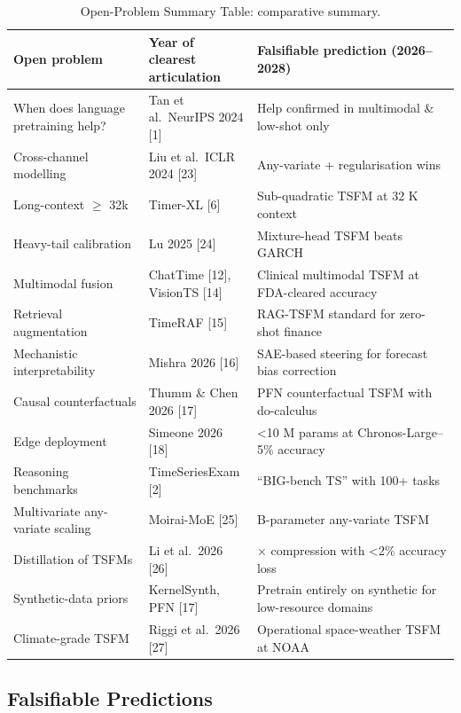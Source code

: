 \documentclass{article}
\begin{document}
\begin{table}[t]
\centering
\caption{Open-Problem Summary Table: comparative summary.}
\label{tab:open-problem-summary-table}
\begin{tabular}{>{\raggedright\arraybackslash}p{0.3000\linewidth}
  >{\raggedright\arraybackslash}p{0.2417\linewidth}
  >{\raggedright\arraybackslash}p{0.4583\linewidth}}
\toprule
Open problem & Year of clearest articulation & Falsifiable prediction (2026--2028) \\
\midrule
When does language pretraining help? & Tan et al.~NeurIPS 2024 {[}1{]} & Help confirmed in multimodal \& low-shot only \\
Cross-channel modelling & Liu et al.~ICLR 2024 {[}23{]} & Any-variate + regularisation wins \\
Long-context \(\geq\) 32k & Timer-XL {[}6{]} & Sub-quadratic TSFM at 32 K context \\
Heavy-tail calibration & Lu 2025 {[}24{]} & Mixture-head TSFM beats GARCH \\
Multimodal fusion & ChatTime {[}12{]}, VisionTS {[}14{]} & Clinical multimodal TSFM at FDA-cleared accuracy \\
Retrieval augmentation & TimeRAF {[}15{]} & RAG-TSFM standard for zero-shot finance \\
Mechanistic interpretability & Mishra 2026 {[}16{]} & SAE-based steering for forecast bias correction \\
Causal counterfactuals & Thumm \& Chen 2026 {[}17{]} & PFN counterfactual TSFM with do-calculus \\
Edge deployment & Simeone 2026 {[}18{]} & \textless10 M params at Chronos-Large--5\% accuracy \\
Reasoning benchmarks & TimeSeriesExam {[}2{]} & ``BIG-bench TS'' with 100+ tasks \\
Multivariate any-variate scaling & Moirai-MoE {[}25{]} & 10 B-parameter any-variate TSFM \\
Distillation of TSFMs & Li et al.~2026 {[}26{]} & 4× compression with \textless2\% accuracy loss \\
Synthetic-data priors & KernelSynth, PFN {[}17{]} & Pretrain entirely on synthetic for low-resource domains \\
Climate-grade TSFM & Riggi et al.~2026 {[}27{]} & Operational space-weather TSFM at NOAA \\
\end{tabular}
\end{table}

\subsection{Falsifiable Predictions}\label{falsifiable-predictions}
\end{document}
